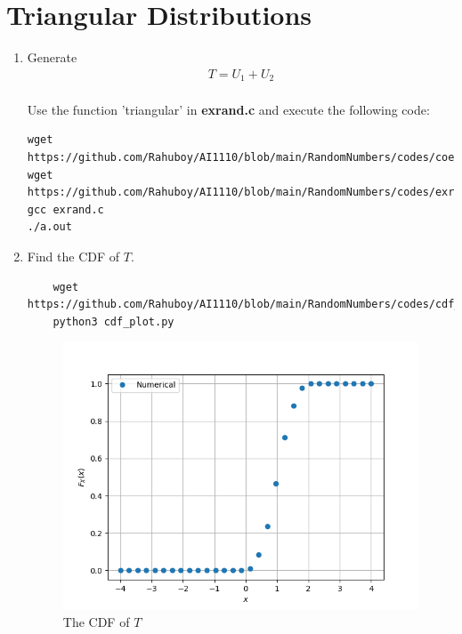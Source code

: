 \documentclass[journal,12pt,twocolumn]{IEEEtran}
\renewcommand\thesection{\arabic{section}}
\begin{document}
\section{Triangular Distributions}
\begin{enumerate}[label=\thesection.\arabic*
    ,ref=\thesection.\theenumi]
\item Generate 
	\begin{align}
		T = U_1+U_2
	\end{align}
\\
\solution Use the function 'triangular' in \textbf{exrand.c} and execute the following code:
\begin{lstlisting}
wget https://github.com/Rahuboy/AI1110/blob/main/RandomNumbers/codes/coeffs.h
wget https://github.com/Rahuboy/AI1110/blob/main/RandomNumbers/codes/exrand.c
gcc exrand.c
./a.out
    \end{lstlisting}

\item Find the CDF of $T$.
\\

\solution  

\begin{lstlisting}
    wget https://github.com/Rahuboy/AI1110/blob/main/RandomNumbers/codes/cdf_plot.py
    python3 cdf_plot.py
    \end{lstlisting}
  
    \begin{figure}
        \centering
        \includegraphics[width=\columnwidth]{./figures/CDF_tri.png}
        \caption{The CDF of $T$}
        \label{fig:tri_cdf}
        \end{figure}


\end{enumerate}
\end{document}
